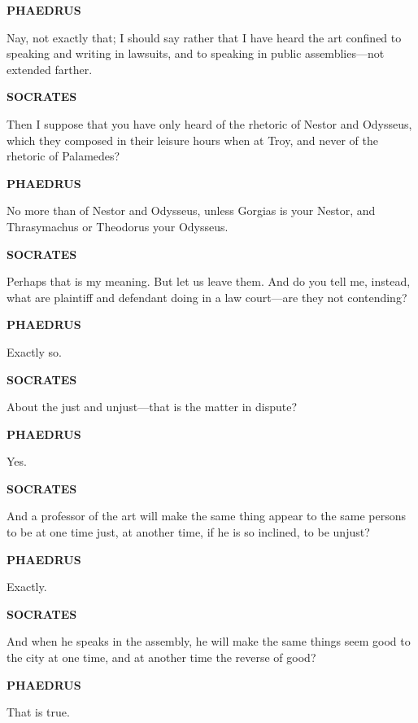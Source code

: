 \documentclass[11pt,letter]{article}
\begin{document}
\par \textbf{PHAEDRUS}
\par   Nay, not exactly that; I should say rather that I have heard the art confined to speaking and writing in lawsuits, and to speaking in public assemblies—not extended farther.

\par \textbf{SOCRATES}
\par   Then I suppose that you have only heard of the rhetoric of Nestor and Odysseus, which they composed in their leisure hours when at Troy, and never of the rhetoric of Palamedes?

\par \textbf{PHAEDRUS}
\par   No more than of Nestor and Odysseus, unless Gorgias is your Nestor, and Thrasymachus or Theodorus your Odysseus.

\par \textbf{SOCRATES}
\par   Perhaps that is my meaning. But let us leave them. And do you tell me, instead, what are plaintiff and defendant doing in a law court—are they not contending?

\par \textbf{PHAEDRUS}
\par   Exactly so.

\par \textbf{SOCRATES}
\par   About the just and unjust—that is the matter in dispute?

\par \textbf{PHAEDRUS}
\par   Yes.

\par \textbf{SOCRATES}
\par   And a professor of the art will make the same thing appear to the same persons to be at one time just, at another time, if he is so inclined, to be unjust?

\par \textbf{PHAEDRUS}
\par   Exactly.

\par \textbf{SOCRATES}
\par   And when he speaks in the assembly, he will make the same things seem good to the city at one time, and at another time the reverse of good?

\par \textbf{PHAEDRUS}
\par   That is true.
\end{document}
